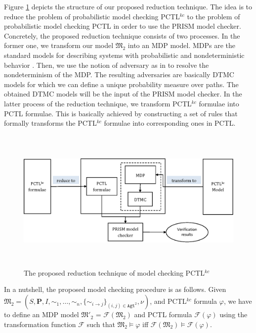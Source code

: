 Figure \ref{fig:reduction-process-PCTLKC} depicts the structure of our proposed reduction technique. The idea is to reduce the problem of probabilistic model checking PCTL$^{kc}$ to the problem of probabilistic model checking PCTL in order to use the PRISM model checker. Concretely, the proposed reduction technique consists of two processes. In the former one, we transform our model $\mathfrak{M_2}$ into an MDP model.
MDPs are the standard models for describing systems with probabilistic and nondeterministic behavior \cite{Rutten2004}. Then, we use the notion of adversary as in \cite{Kwiatkowska2003} to resolve the nondeterminism of the MDP. The resulting adversaries are basically DTMC models for which we can define a unique probability measure over paths. The obtained DTMC models will be the input of the PRISM model checker. In the latter process of the reduction technique, we transform PCTL$^{kc}$ formulae into PCTL formulae. This is basically achieved by constructing a set of rules that formally transforms the PCTL$^{kc}$ formulae into corresponding ones in PCTL.

\begin{figure}[h]
\centering
\includegraphics[width=14cm, height=7cm]{chap4/img/reduction-process-cha4.eps}
\caption{The proposed reduction technique of model checking PCTL$^{kc}$}
\label{fig:reduction-process-PCTLKC}
\end{figure}


In a nutshell, the proposed model checking procedure is as follows. Given $\mathfrak{M_2}=(S,\textbf{P},I,\sim_1, \ldots
,\sim_n,\{\sim_{i \rightarrow j}\}_{{(i,j)}\in \texttt{Agt}^2},\nu)$, and PCTL$^{kc}$ formula $\varphi$, we have to define an MDP model $\mathfrak{M'_2}$ = $\mathscr{F}(\mathfrak{M_2})$ and PCTL formula $\mathscr{F}(\varphi)$ using the transformation function $\mathscr{F}$ such that $\mathfrak{M_2} \models \varphi$ iff $\mathscr{F}(\mathfrak{M_2})\models \mathscr{F}(\varphi)$.


